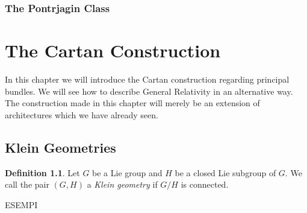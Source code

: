 \documentclass[12pt,a4paper]{report}
\theoremstyle{definition}
\newtheorem{Def}{Definition}[chapter]
\theoremstyle{Theorem}
\theoremstyle{definition}
\theoremstyle{definition}
\begin{document}
			\subsection{The Pontrjagin Class}
		\chapter{The Cartan Construction}
		In this chapter we will introduce the Cartan construction regarding principal bundles. We will see how to describe General Relativity in an alternative way. The construction made in this chapter will merely be an extension of architectures which we have already seen. 
		\section{Klein Geometries}
		\begin{Def}
			Let $G$ be a Lie group and $H$ be a closed Lie subgroup of $G$. We call the pair $(G,H)$ a \textit{Klein geometry} if $G/H$ is connected.
		\end{Def}
		ESEMPI
\end{document}

